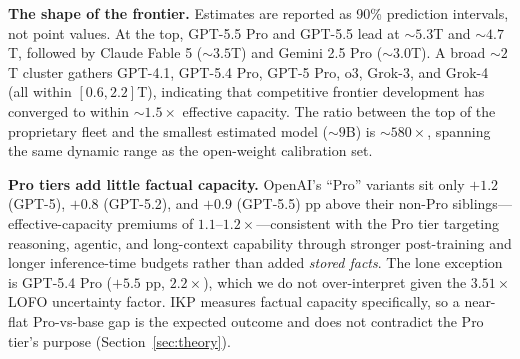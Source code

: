 \documentclass[11pt]{article}
\begin{document}
\begin{table}[H]
\centering
\caption{Effective knowledge capacity of proprietary frontier models, in open-model-equivalent parameters, with uncertainty bands from the 93-model calibration ($R^2 = 0.910$, $\lambda = 0$). For an unseen family, the relevant LOFO 90\% fold-error factor is $3.51\times$. Estimates above ${\sim}1$T rest on only two calibration anchors and carry wider uncertainty than this global factor (Section~\ref{sec:limitations}). The Gemini 3.x family is excluded (Gemini 3.1 Pro is the T6 landmark; the Flash line inherits its inflation).}
\label{tab:frontier}
{\small}
\end{table}

\textbf{The shape of the frontier.} Estimates are reported as 90\% prediction intervals, not point values. At the top, GPT-5.5 Pro and GPT-5.5 lead at ${\sim}5.3$T and ${\sim}4.7$T, followed by Claude Fable 5 (${\sim}3.5$T) and Gemini 2.5 Pro (${\sim}3.0$T). A broad ${\sim}2$T cluster gathers GPT-4.1, GPT-5.4 Pro, GPT-5 Pro, o3, Grok-3, and Grok-4 (all within $[0.6, 2.2]$T), indicating that competitive frontier development has converged to within ${\sim}1.5\times$ effective capacity. The ratio between the top of the proprietary fleet and the smallest estimated model (${\sim}9$B) is ${\sim}580\times$, spanning the same dynamic range as the open-weight calibration set.

\textbf{Pro tiers add little factual capacity.} OpenAI's ``Pro'' variants sit only $+1.2$ (GPT-5), $+0.8$ (GPT-5.2), and $+0.9$ (GPT-5.5) pp above their non-Pro siblings---effective-capacity premiums of $1.1$--$1.2\times$---consistent with the Pro tier targeting reasoning, agentic, and long-context capability through stronger post-training and longer inference-time budgets rather than added \emph{stored facts}. The lone exception is GPT-5.4 Pro ($+5.5$ pp, $2.2\times$), which we do not over-interpret given the $3.51\times$ LOFO uncertainty factor. IKP measures factual capacity specifically, so a near-flat Pro-vs-base gap is the expected outcome and does not contradict the Pro tier's purpose (Section~\ref{sec:theory}).
\end{document}
